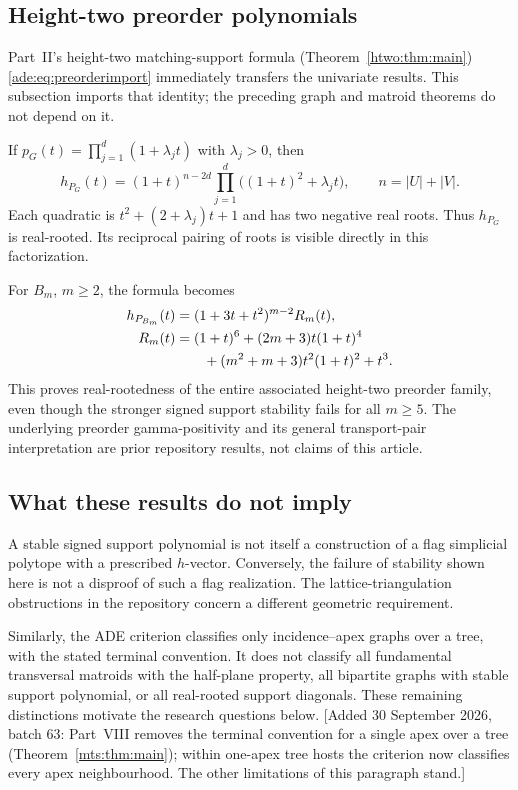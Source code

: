 \documentclass[11pt]{article}
\numberwithin{equation}{section}
\theoremstyle{definition}
\begin{document}
\subsection{Height-two preorder polynomials}

Part~II's height-two matching-support formula (Theorem~\ref{htwo:thm:main})
\eqref{ade:eq:preorderimport} immediately transfers the univariate results.
This subsection imports that identity; the preceding graph and matroid
theorems do not depend on it.

If $p_G(t)=\prod_{j=1}^d(1+\lambda_jt)$ with $\lambda_j>0$, then
\begin{equation}
 h_{P_G}(t)=(1+t)^{n-2d}
       \prod_{j=1}^d\bigl((1+t)^2+\lambda_jt\bigr),
 \qquad n=|U|+|V|.
 \label{ade:eq:hfactor}
\end{equation}
Each quadratic is $t^2+(2+\lambda_j)t+1$ and has two negative real roots.
Thus $h_{P_G}$ is real-rooted.  Its reciprocal pairing of roots is visible
directly in this factorization.

For $B_m$, $m\ge2$, the formula becomes
\begin{align}
 h_{P_{B_m}}(t)
 &=(1+3t+t^2)^{m-2}R_m(t),\label{ade:eq:bookh}\\
 R_m(t)
 &=(1+t)^6+(2m+3)t(1+t)^4\notag\\
 &\qquad +(m^2+m+3)t^2(1+t)^2+t^3.
 \label{ade:eq:booksextic}
\end{align}
This proves real-rootedness of the entire associated height-two preorder
family, even though the stronger signed support stability fails for all
$m\ge5$.  The underlying preorder gamma-positivity and its general
transport-pair interpretation are prior repository results, not claims
of this article.

\subsection{What these results do not imply}

A stable signed support polynomial is not itself a construction of a flag
simplicial polytope with a prescribed $h$-vector.  Conversely, the failure
of stability shown here is not a disproof of such a flag realization.
The lattice-triangulation obstructions in the repository concern a
different geometric requirement.

Similarly, the ADE criterion classifies only incidence--apex graphs over
a tree, with the stated terminal convention.  It does not classify all
fundamental transversal matroids with the half-plane property, all
bipartite graphs with stable support polynomial, or all real-rooted
support diagonals.  These remaining distinctions motivate the research
questions below.
[Added 30 September 2026, batch 63: Part~VIII removes the terminal
convention for a single apex over a tree (Theorem~\ref{mts:thm:main});
within one-apex tree hosts the criterion now classifies every apex
neighbourhood. The other limitations of this paragraph stand.]
\end{document}
